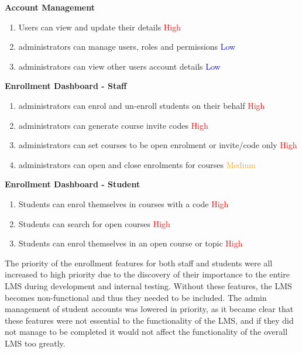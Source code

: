 \textbf{Account Management}
\begin{enumerate}
    \item Users can view and update their details \textcolor{Red}{High}
    \item administrators can manage users, roles and permissions \textcolor{Blue}{Low}
    \item administrators can view other users account details \textcolor{Blue}{Low}
\end{enumerate}

\textbf{Enrollment Dashboard - Staff}
\begin{enumerate}
    \item administrators can enrol and un-enroll students on their behalf \textcolor{Red}{High}
    \item administrators can generate course invite codes \textcolor{Red}{High}
    \item administrators can set courses to be open enrolment or invite/code only \textcolor{Red}{High}
    \item administrators can open and close enrolments for courses \textcolor{Orange}{Medium}
\end{enumerate}

\textbf{Enrollment Dashboard - Student}
\begin{enumerate}
    \item Students can enrol themselves in courses with a code \textcolor{Red}{High}
    \item Students can search for open courses \textcolor{Red}{High}
    \item Students can enrol themselves in an open course or topic \textcolor{Red}{High}
\end{enumerate}

The priority of the enrollment features for both staff and students were all increased to high priority due to the discovery of their importance to the entire LMS during development and internal testing. Without these features, the LMS becomes non-functional and thus they needed to be included. The admin management of student accounts was lowered in priority, as it became clear that these features were not essential to the functionality of the LMS, and if they did not manage to be completed it would not affect the functionality of the overall LMS too greatly.

